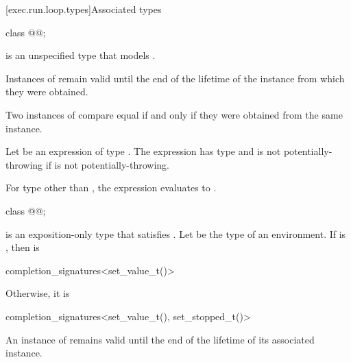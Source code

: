 [exec.run.loop.types]{Associated types}

\begin{itemdecl}
class @@;
\end{itemdecl}

\pnum
{} is an unspecified type
that models .

\pnum
Instances of  remain valid
until the end of the lifetime of the  instance
from which they were obtained.

\pnum
Two instances of  compare equal
if and only if they were obtained from the same  instance.

\pnum
Let  be an expression of type .
The expression 
has type  and
is not potentially-throwing if  is not potentially-throwing.

\pnum
For type  other than ,
the expression
evaluates to .

\begin{itemdecl}
class @@;
\end{itemdecl}

\pnum
{} is an exposition-only type
that satisfies .
Let  be the type of an environment.
If  is , then
 is
\begin{codeblock}
completion_signatures<set_value_t()>
\end{codeblock}
Otherwise, it is
\begin{codeblock}
completion_signatures<set_value_t(), set_stopped_t()>
\end{codeblock}

\pnum
An instance of  remains valid
until the end of the lifetime of its associated  instance.

